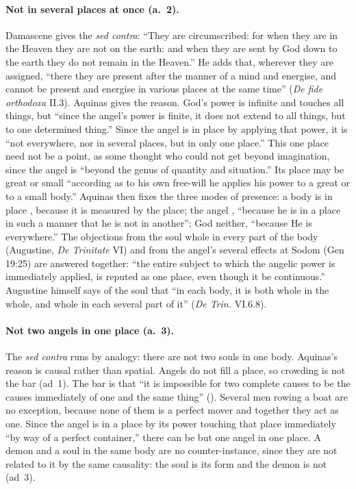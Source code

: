 \paragraph{Not in several places at once (a.~2).} Damascene gives the
\emph{sed contra}: ``They are circumscribed: for
when they are in the Heaven they are not on the earth: and when they are
sent by God down to the earth they do not remain in the Heaven.'' He adds
that, wherever they are assigned, ``there they are present after the
manner of a mind and energise, and cannot be present and energise in
various places at the same time'' (\emph{De fide orthodoxa} II.3). Aquinas
gives the reason. God's power is infinite and touches all things, but
``since the angel's power is finite, it does not extend to all things, but
to one determined thing.'' Since the angel is in place by applying that power, it
is ``not everywhere, nor in several places, but in only one place.'' This
one place need not be a point, as some thought who could not get beyond
imagination, since the angel is ``beyond the genus of quantity and
situation.'' Its place may be great or small ``according as to his own
free-will he applies his power to a great or to a small body.'' Aquinas
then fixes the three modes of presence: a body is in place
, because it is measured by the place; the angel
, ``because he is in a place in such a manner that he is
not in another''; God neither, ``because He is everywhere.'' The objections
from the soul whole in every part of the body (Augustine, \emph{De
Trinitate} VI) and from the angel's several effects at Sodom (Gen 19:25)
are answered together: ``the entire subject to which the angelic power is
immediately applied, is reputed as one place, even though it be
continuous.'' Augustine himself says of the soul that ``in each
body, it is both whole in the whole, and whole in each several part of
it'' (\emph{De Trin.} VI.6.8).

\paragraph{Not two angels in one place (a.~3).} The \emph{sed contra} runs
by analogy: there are not two souls in one body. Aquinas's reason is causal
rather than spatial. Angels do not fill a place, so crowding is not the
bar (ad~1). The bar is that ``it is impossible for two complete causes to
be the causes immediately of one and the same thing'' ().
Several men rowing a boat are no exception, because none of them is a
perfect mover and together they act as one. Since the angel is in a place
by its power touching that place immediately ``by way of a perfect
container,'' there can be but one angel in one place. A demon and a soul
in the same body are no counter-instance, since they are not related to it
by the same causality: the soul is its form and the demon is not (ad~3).


